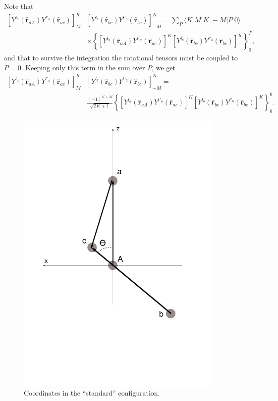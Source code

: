 Note that
\begin{equation}\label{eqC6AppG19}
\begin{split}
\left[ Y^{l_a} (\hat{\mathbf r}_{aA}) Y^{l'_a} (\hat{ \mathbf r}_{ac})\right]^K_M &   \left[ Y^{l_b} (\hat{\mathbf r}_{bc}) Y^{l'_b} (\hat{\mathbf r}_{bc})\right]^{K}_{-M}=\sum_P \langle K\;M\;K\;-M|P\;0\rangle\\
&\times \left\{\left[ Y^{l_a} (\hat{\mathbf r}_{aA}) Y^{l'_a} (\hat{ \mathbf r}_{ac})\right]^K\left[ Y^{l_b} (\hat{\mathbf r}_{bc}) Y^{l'_b} (\hat{\mathbf r}_{bc})\right]^{K} \right\}^P_0,
\end{split}
\end{equation}
and that to survive the integration the rotational tensors must be coupled to $P=0$. Keeping only this term in the sum over $P$, we get
\begin{equation}\label{eqC6AppF17}
\begin{split}
\left[ Y^{l_a} (\hat{\mathbf r}_{aA}) Y^{l'_a} (\hat{ \mathbf r}_{ac})\right]^K_M &   \left[ Y^{l_b} (\hat{\mathbf r}_{bc}) Y^{l'_b} (\hat{\mathbf r}_{bc})\right]^{K}_{-M}=\\
&\frac{(-1)^{K+M}}{\sqrt{2K+1}}\left\{\left[ Y^{l_a} (\hat{\mathbf r}_{aA}) Y^{l'_a} (\hat{ \mathbf r}_{ac})\right]^K\left[ Y^{l_b} (\hat{\mathbf r}_{bc}) Y^{l'_b} (\hat{\mathbf r}_{bc})\right]^{K} \right\}^0_0.
\end{split}
\end{equation}
 \begin{figure}
\centerline{\includegraphics*[width=10cm,angle=0]{C6/figs_C6/coords2.pdf}}
\vspace{-3cm}
\caption{Coordinates in the ``standard'' configuration.}\label{figC6AppF2}
\end{figure}
